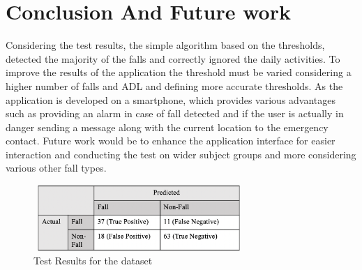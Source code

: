\documentclass[conference]{IEEEtran}
\begin{document}
\section{Conclusion And Future work}
Considering the test results, the simple algorithm based on the thresholds, detected the majority of the falls and correctly ignored the daily activities. To improve the results of the application the threshold must be varied considering a higher number of falls and ADL and defining more accurate thresholds. As the application is developed on a smartphone, which provides various advantages such as providing an alarm in case of fall detected and if the user is actually in danger sending a message along with the current location to the emergency contact. Future work would be to enhance the application interface for easier interaction and conducting the test on wider subject groups and more considering various other fall types.

\begin{figure}
\centerline{\includegraphics[width=8cm, height=2.5cm]{results.png}}
\caption{Test Results for the dataset}
\label{result}
\end{figure}
\end{document}
